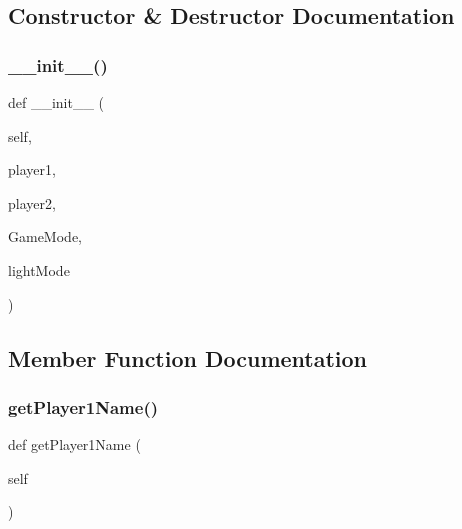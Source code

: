 \subsection{Constructor \& Destructor Documentation}
\hypertarget{classgame_1_1game_1_1_game_a84a2c5df02ca5f02dc12bfec660ad82a}{}\label{classgame_1_1game_1_1_game_a84a2c5df02ca5f02dc12bfec660ad82a} 
\subsubsection{\texorpdfstring{\+\_\+\+\_\+init\+\_\+\+\_\+()}{\_\_init\_\_()}}
{\footnotesize\ttfamily def \+\_\+\+\_\+init\+\_\+\+\_\+ (\begin{DoxyParamCaption}\item[{}]{self,  }\item[{}]{player1,  }\item[{}]{player2,  }\item[{}]{Game\+Mode,  }\item[{}]{light\+Mode }\end{DoxyParamCaption})}



\subsection{Member Function Documentation}
\hypertarget{classgame_1_1game_1_1_game_aed504f4752749c9ca28461f4628ae5c3}{}\label{classgame_1_1game_1_1_game_aed504f4752749c9ca28461f4628ae5c3} 
\subsubsection{\texorpdfstring{get\+Player1\+Name()}{getPlayer1Name()}}
{\footnotesize\ttfamily def get\+Player1\+Name (\begin{DoxyParamCaption}\item[{}]{self }\end{DoxyParamCaption})}

\hypertarget{classgame_1_1game_1_1_game_acd678d3a250de66662badf84935e5ffb}{}\label{classgame_1_1game_1_1_game_acd678d3a250de66662badf84935e5ffb} 
